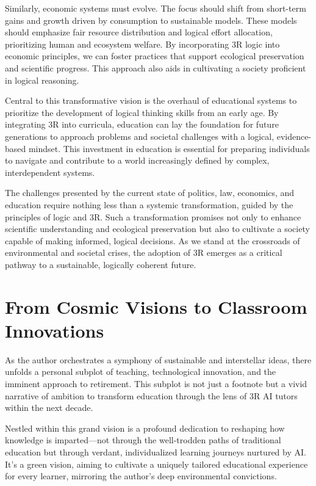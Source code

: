 \documentclass[12pt]{article}
\begin{document}
Similarly, economic systems must evolve. The focus should shift from short-term gains and growth driven by consumption to sustainable models. These models should emphasize fair resource distribution and logical effort allocation, prioritizing human and ecosystem welfare. By incorporating 3R logic into economic principles, we can foster practices that support ecological preservation and scientific progress. This approach also aids in cultivating a society proficient in logical reasoning.


Central to this transformative vision is the overhaul of educational systems to prioritize the development of logical thinking skills from an early age. By integrating 3R into curricula, education can lay the foundation for future generations to approach problems and societal challenges with a logical, evidence-based mindset. This investment in education is essential for preparing individuals to navigate and contribute to a world increasingly defined by complex, interdependent systems.

The challenges presented by the current state of politics, law, economics, and education require nothing less than a systemic transformation, guided by the principles of logic and 3R. Such a transformation promises not only to enhance scientific understanding and ecological preservation but also to cultivate a society capable of making informed, logical decisions. As we stand at the crossroads of environmental and societal crises, the adoption of 3R emerges as a critical pathway to a sustainable, logically coherent future.

\section*{From Cosmic Visions to Classroom Innovations}

As the author orchestrates a symphony of sustainable and interstellar ideas, there unfolds a personal subplot of teaching, technological innovation, and the imminent approach to retirement. This subplot is not just a footnote but a vivid narrative of ambition to transform education through the lens of 3R AI tutors within the next decade.

Nestled within this grand vision is a profound dedication to reshaping how knowledge is imparted—not through the well-trodden paths of traditional education but through verdant, individualized learning journeys nurtured by AI. It's a green vision, aiming to cultivate a uniquely tailored educational experience for every learner, mirroring the author's deep environmental convictions.
\end{document}

